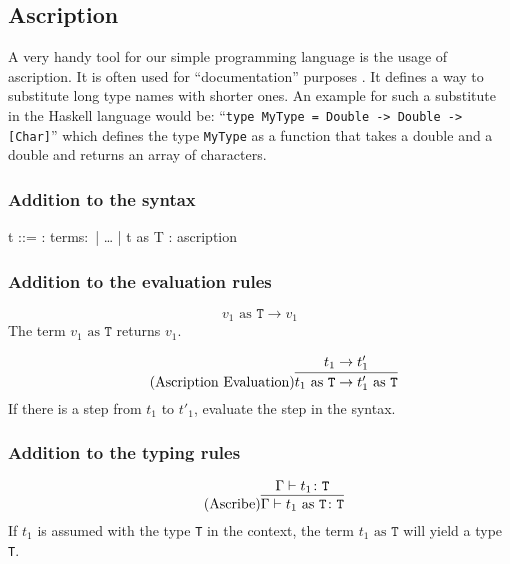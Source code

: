 \subsection{Ascription}

A very handy tool for our simple programming language is the usage of ascription.
It is often used for ``documentation'' purposes \cite{pierce2002ProgLang}. It defines
a way to substitute long type names with shorter ones. An example for such a substitute
in the Haskell language would be: ``\texttt{type MyType = Double -> Double -> [Char]}''
which defines the type \texttt{MyType} as a function that takes a double and a double
and returns an array of characters.

\subsubsection{Addition to the syntax \cite{pierce2002ProgLang}}
\begin{bnfgrammar}
    t ::= : terms$\colon$
    | \dots
    | t as T : ascription
\end{bnfgrammar}\leavevmode\newline

\subsubsection{Addition to the evaluation rules \cite{pierce2002ProgLang}}
\begin{equation*}
    \tag{Ascribe Value}
    v_1 \text{ as } \texttt{T} \rightarrow v_1
\end{equation*}
The term $v_1 \text{ as } \texttt{T}$ returns $v_1$.

\begin{equation*}
    \tag{Ascription Evaluation}
    \infer{
        t_1 \text{ as } \texttt{T} \rightarrow t'_1 \text{ as } \texttt{T}
    }{
        t_1 \rightarrow t'_1
    }
\end{equation*}
If there is a step from $t_1$ to $t'_1$, evaluate the step
in the syntax.

\subsubsection{Addition to the typing rules \cite{pierce2002ProgLang}}
\begin{equation*}
    \tag{Ascribe}
    \infer{
        \Gamma \vdash t_1 \text{ as } \texttt{T} \colon \texttt{T}
    }{
        \Gamma \vdash t_1 \colon \texttt{T}
    }
\end{equation*}
If $t_1$ is assumed with the type \texttt{T} in the context,
the term $t_1 \text{ as } \texttt{T}$ will yield a type \texttt{T}.
